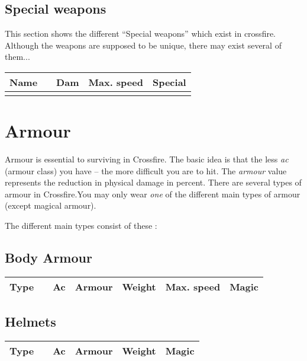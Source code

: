\documentclass[11pt, a4paper]{article}
\begin{document}
\subsection*{Special weapons}

This section shows the different ``Special weapons'' which exist in
crossfire.  Although the weapons are supposed to be unique, there may
exist several of them...

{\small 
\begin{longtable}{|c|c|r|r|p{7cm}|}
\hline
Name&&Dam&Max. speed&Special\\
\hline
\hline
\endhead
\hline
\endfoot

\end{longtable}
}

\section*{Armour}
 
Armour is essential to surviving in Crossfire.
The basic idea is that the less {\it ac} (armour class) you have -- the more 
difficult you are to hit.
The {\it armour} value represents the reduction in physical damage in percent.
There are several types of armour in Crossfire.You may only wear {\em one}
of the different main types of armour (except magical armour).

The different main types consist of these :
\subsection*{Body Armour}

{\small 
\begin{center}
\begin{tabular}{|c|c|r|r|r|r|p{4cm}|}
\hline
Type&&Ac& Armour&Weight&Max. speed&Magic\\
\hline
\hline

\hline
\end{tabular}
\end{center} 
}
\subsection*{Helmets}

{\small 
\begin{center}
\begin{tabular}{|c|c|r|r|r|p{6cm}|}
\hline
Type&&Ac&Armour&Weight&Magic\\
\hline
\hline

\hline
\end{tabular}
\end{center} 
}
\end{document}
